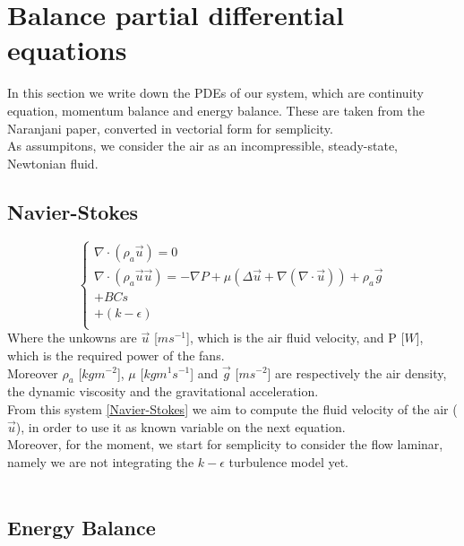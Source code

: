 \section{Balance partial differential equations}
	
In this section we write down the PDEs of our system, which are continuity equation, momentum balance and energy balance. These are taken from the Naranjani paper, converted in vectorial form for semplicity.\\
As assumpitons, we consider the air as an incompressible, steady-state, Newtonian fluid.
	
\subsection{Navier-Stokes}
	
\begin{equation} \label{Navier-Stokes}
	\begin{cases}
		\nabla\cdot( \rho_a \vec{u} ) = 0  \\
		\nabla \cdot ( \rho_a \vec{u} \vec{u} ) = - \nabla P + \mu( \Delta \vec{u} + \nabla(\nabla\cdot\vec{u} )) + \rho_a\vec{g} \\
		+ BCs \\
		+ (k-\epsilon) \\
	\end{cases}	
\end{equation}
Where the unkowns are $\vec{u}$ [$ms^{-1}$], which is the air fluid velocity, and P [$W$], which is the required power of the fans.\\
Moreover $\rho_a$ [$kg m^{-2}$], $\mu$ [$kg m^{1} s^{-1}$] and $\vec{g}$ [$ms^{-2}$] are respectively the air density, the dynamic viscosity and the gravitational acceleration.\\
From this system \eqref{Navier-Stokes} we aim to compute the fluid velocity of the air ($\vec{u}$), in order to use it as known variable on the next equation.\\
Moreover, for the moment, we start for semplicity to consider the flow laminar, namely we are not integrating the $k-\epsilon$ turbulence model yet.\\
\
\subsection{Energy Balance}
	
